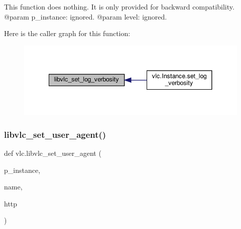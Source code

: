 \begin{DoxyVerb}This function does nothing.
It is only provided for backward compatibility.
@param p_instance: ignored.
@param level: ignored.
\end{DoxyVerb}
 Here is the caller graph for this function\+:
\nopagebreak
\begin{figure}[H]
\begin{center}
\leavevmode
\includegraphics[width=341pt]{namespacevlc_aca5f2f88af6fc65ce68b4a68a0e1cf5a_icgraph}
\end{center}
\end{figure}
\mbox{\label{namespacevlc_ac417c29edf981dc1f14649d41624e2b5}} 
\subsubsection{\texorpdfstring{libvlc\+\_\+set\+\_\+user\+\_\+agent()}{libvlc\_set\_user\_agent()}}
{\footnotesize\ttfamily def vlc.\+libvlc\+\_\+set\+\_\+user\+\_\+agent (\begin{DoxyParamCaption}\item[{}]{p\+\_\+instance,  }\item[{}]{name,  }\item[{}]{http }\end{DoxyParamCaption})}

